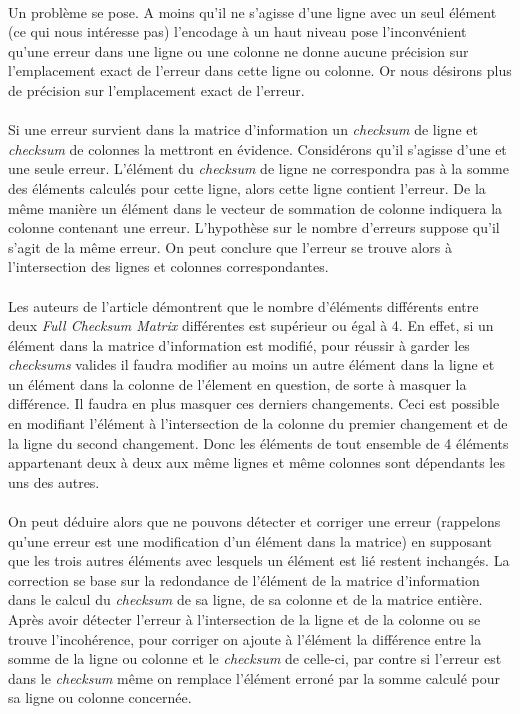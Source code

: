 \documentclass[a4paper, 10pt]{report}
\begin{document}
\paragraph*{}
Un problème se pose. A moins qu’il ne s’agisse d’une ligne avec un seul élément (ce qui nous intéresse pas) l’encodage 
à un haut niveau pose l’inconvénient qu’une erreur dans une ligne ou une colonne ne donne aucune précision sur 
l’emplacement exact de l’erreur dans cette ligne ou colonne. Or nous désirons plus de précision sur l’emplacement 
exact de l’erreur.
\paragraph*{}
Si une erreur survient dans la matrice d’information un \textit{checksum} de ligne et \textit{checksum} de colonnes 
la mettront en évidence.\newline
Considérons qu’il s’agisse d’une et une seule erreur. L’élément du \textit{checksum} de ligne ne correspondra pas 
à la somme des éléments calculés pour cette ligne, alors cette ligne contient l’erreur. De la même manière un élément 
dans le vecteur de sommation de colonne indiquera la colonne contenant une erreur. L’hypothèse sur le nombre d’erreurs 
suppose qu’il s’agit de la même erreur. On peut conclure que l’erreur se trouve alors à l’intersection des lignes et 
colonnes correspondantes.
\paragraph*{}
Les auteurs de l’article démontrent que le nombre d’éléments différents entre deux \textit{Full Checksum Matrix} différentes 
est supérieur ou égal à 4. En effet, si un élément dans la matrice d’information est modifié, pour réussir à garder 
les \textit{checksums} valides il faudra modifier au moins un autre élément dans la ligne et un élément dans la colonne de 
l'élement en question, de sorte à masquer la différence. Il faudra en plus masquer ces derniers changements. Ceci est possible
en modifiant l'élément à l'intersection de la colonne du premier changement et de la ligne du second changement. Donc les 
éléments de tout ensemble de 4 éléments appartenant deux à deux aux même lignes et même colonnes sont dépendants les uns des autres.
\paragraph*{}
On peut déduire alors que ne pouvons détecter et corriger une erreur (rappelons qu’une erreur est une modification d’un
élément dans la matrice) en supposant que les trois autres éléments avec lesquels un élément est lié restent inchangés.
La correction se base sur la redondance de l’élément de la matrice d’information dans le calcul du \textit{checksum} de 
sa ligne, de sa colonne et de la matrice entière. Après avoir détecter l’erreur à l’intersection de la ligne et de la 
colonne ou se trouve l’incohérence, pour corriger on ajoute à l’élément la différence entre la somme de la ligne ou 
colonne et le \textit{checksum} de celle-ci, par contre si l’erreur est dans le \textit{checksum} même on remplace 
l’élément erroné par la somme calculé pour sa ligne ou colonne concernée.
\end{document}
